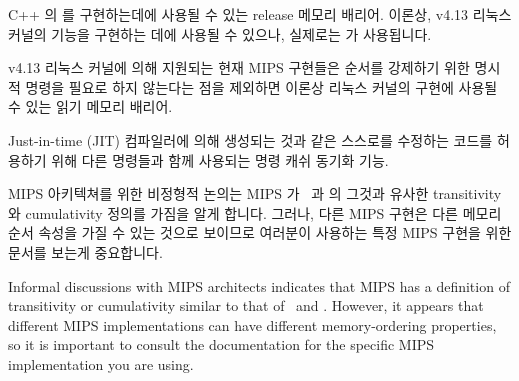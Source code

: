 \begin{description}[style=nextline]
\fi

\item[\tco{SYNC_RELEASE}]
	C++ 의  를 구현하는데에
	사용될 수 있는 release 메모리 배리어.
	이론상, v4.13 리눅스 커널의  기능을 구현하는
	데에 사용될 수 있으나, 실제로는  가 사용됩니다.
\item[\tco{SYNC_RMB}]
	v4.13 리눅스 커널에 의해 지원되는 현재 MIPS 구현들은 순서를 강제하기
	위한 명시적 명령을 필요로 하지 않는다는 점을 제외하면 이론상 리눅스
	커널의  구현에 사용될 수 있는 읽기 메모리 배리어.
\item[\tco{SYNCI}]
	Just-in-time (JIT) 컴파일러에 의해 생성되는 것과 같은 스스로를 수정하는
	코드를 허용하기 위해 다른 명령들과 함께 사용되는 명령 캐쉬 동기화 기능.

\end{description}

MIPS 아키텍쳐를 위한 비정형적 논의는 MIPS 가 \ARM\ 과 \Power{} 의 그것과 유사한
transitivity 와 cumulativity 정의를 가짐을 알게 합니다.
그러나, 다른 MIPS 구현은 다른 메모리 순서 속성을 가질 수 있는 것으로 보이므로
여러분이 사용하는 특정 MIPS 구현을 위한 문서를 보는게 중요합니다.

\iffalse

Informal discussions with MIPS architects indicates that MIPS has a
definition of transitivity or cumulativity similar to that of
\ARM\ and \Power{}\@.
However, it appears that different MIPS implementations can have
different memory-ordering properties, so it is important to consult
the documentation for the specific MIPS implementation you are using.

